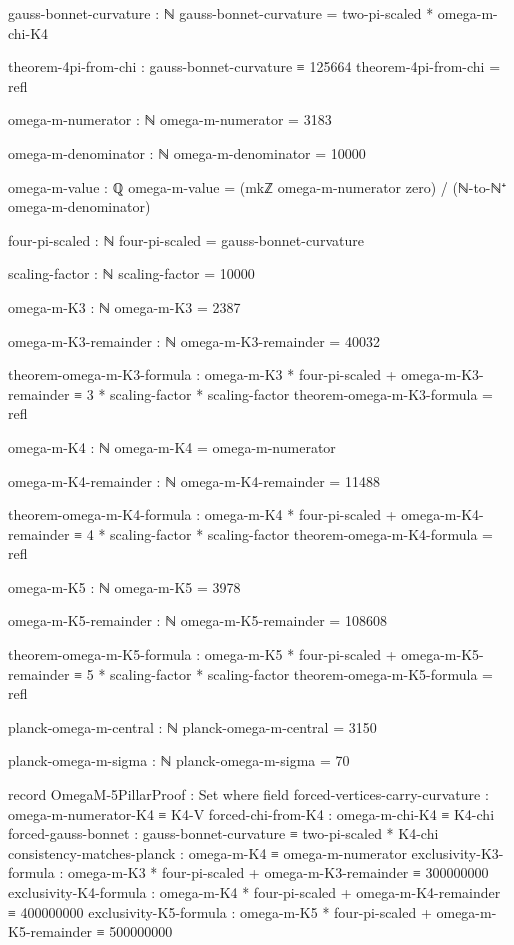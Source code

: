 \documentclass[11pt,a4paper]{book}
\begin{document}
\begin{code}
gauss-bonnet-curvature : ℕ
gauss-bonnet-curvature = two-pi-scaled * omega-m-chi-K4

theorem-4pi-from-chi : gauss-bonnet-curvature ≡ 125664
theorem-4pi-from-chi = refl

omega-m-numerator : ℕ
omega-m-numerator = 3183

omega-m-denominator : ℕ
omega-m-denominator = 10000

omega-m-value : ℚ
omega-m-value = (mkℤ omega-m-numerator zero) / (ℕ-to-ℕ⁺ omega-m-denominator)


four-pi-scaled : ℕ
four-pi-scaled = gauss-bonnet-curvature

scaling-factor : ℕ
scaling-factor = 10000

omega-m-K3 : ℕ
omega-m-K3 = 2387

omega-m-K3-remainder : ℕ
omega-m-K3-remainder = 40032

theorem-omega-m-K3-formula : omega-m-K3 * four-pi-scaled + omega-m-K3-remainder ≡ 3 * scaling-factor * scaling-factor
theorem-omega-m-K3-formula = refl

omega-m-K4 : ℕ
omega-m-K4 = omega-m-numerator

omega-m-K4-remainder : ℕ
omega-m-K4-remainder = 11488

theorem-omega-m-K4-formula : omega-m-K4 * four-pi-scaled + omega-m-K4-remainder ≡ 4 * scaling-factor * scaling-factor
theorem-omega-m-K4-formula = refl

omega-m-K5 : ℕ
omega-m-K5 = 3978

omega-m-K5-remainder : ℕ
omega-m-K5-remainder = 108608

theorem-omega-m-K5-formula : omega-m-K5 * four-pi-scaled + omega-m-K5-remainder ≡ 5 * scaling-factor * scaling-factor
theorem-omega-m-K5-formula = refl

planck-omega-m-central : ℕ
planck-omega-m-central = 3150

planck-omega-m-sigma : ℕ
planck-omega-m-sigma = 70

record OmegaM-5PillarProof : Set where
  field
    forced-vertices-carry-curvature : omega-m-numerator-K4 ≡ K4-V
    forced-chi-from-K4 : omega-m-chi-K4 ≡ K4-chi
    forced-gauss-bonnet : gauss-bonnet-curvature ≡ two-pi-scaled * K4-chi
    consistency-matches-planck : omega-m-K4 ≡ omega-m-numerator
    exclusivity-K3-formula : omega-m-K3 * four-pi-scaled + omega-m-K3-remainder ≡ 300000000
    exclusivity-K4-formula : omega-m-K4 * four-pi-scaled + omega-m-K4-remainder ≡ 400000000
    exclusivity-K5-formula : omega-m-K5 * four-pi-scaled + omega-m-K5-remainder ≡ 500000000
    

\end{code}
\end{document}
